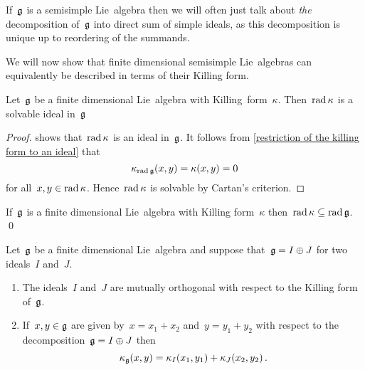  
\begin{remark}
  If~$\mathfrak{g}$ is a semisimple Lie~algebra then we will often just talk about \emph{the} decomposition of~$\mathfrak{g}$ into  direct sum of simple ideals, as this decomposition is unique up to reordering of the summands.
\end{remark}


\begin{fluff}
  We will now show that finite dimensional semisimple Lie~algebras can equivalently be described in terms of their Killing form.
\end{fluff}


\begin{lemma}
  \label{rad kappa is a solvable ideal}
  Let~$\mathfrak{g}$ be a finite dimensional Lie~algebra with Killing~form~$\kappa$.
  Then~$\operatorname{rad} \kappa$ is a solvable ideal in~$\mathfrak{g}$
\end{lemma}


\begin{proof}
   shows that~$\operatorname{rad} \kappa$ is an ideal in~$\mathfrak{g}$.
  It follows from \cref{restriction of the killing form to an ideal} that
  \[
    \kappa_{\operatorname{rad} \mathfrak{g}}(x,y)
    =
    \kappa(x,y)
    =
    0
  \]
  for all~$x, y \in \operatorname{rad} \kappa$.
  Hence~$\operatorname{rad} \kappa$ is solvable by Cartan’s criterion.
\end{proof}


\begin{corollary}
  If~$\mathfrak{g}$ is a finite dimensional Lie~algebra with Killing form~$\kappa$ then~$\operatorname{rad} \kappa \subseteq \operatorname{rad} \mathfrak{g}$.
  \qed
\end{corollary}


\begin{lemma}
  \label{orthogonal ideals with respect to the killing form}
  Let~$\mathfrak{g}$ be a finite dimensional Lie~algebra and suppose that~$\mathfrak{g} = I \oplus J$ for two ideals~$I$ and~$J$.
  \begin{enumerate}
    \item
      The ideals~$I$ and~$J$ are mutually orthogonal with respect to the Killing form of~$\mathfrak{g}$.
    \item
      If~$x,y \in \mathfrak{g}$ are given by~$x = x_1 + x_2$ and~$y = y_1 + y_2$ with respect to the decomposition~$\mathfrak{g} = I \oplus J$ then
      \[
        \kappa_{\mathfrak{g}}(x,y)
        =
        \kappa_I(x_1, y_1) + \kappa_J(x_2, y_2) \,.
      \]
  \end{enumerate}
\end{lemma}


